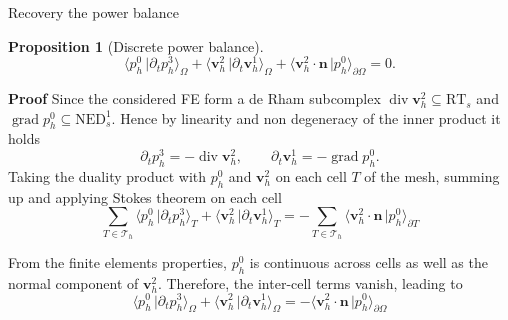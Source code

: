 \documentclass[aspectratio=169]{beamer}
\DeclareMathOperator*{\grad}{grad}
\renewcommand{\div}{\operatorname{div}}
\newcommand{\dualpr}[3][]{\ensuremath{\langle #2 \, \vert #3 \rangle_{#1}}}
\newtheorem{proposition}{Proposition}
\begin{document}
\begin{frame}{Recovery the power balance}
	
	\begin{proposition}[Discrete power balance]
	\begin{equation*}
		\dualpr[\Omega]{p^{0}_h}{\partial_t p^3_h} + \dualpr[\Omega]{\bm{v}^{2}_h}{\partial_t \bm{v}^{1}_h} + \dualpr[\partial \Omega]{\bm{v}^2_h \cdot \bm{n}}{p_{h}^{0}} = 0.
	\end{equation*}
	\end{proposition}
\textbf{Proof} Since the considered FE form a de Rham subcomplex $\div \bm{v}^2_h \subseteq \mathrm{RT}_s$ and $\grad p_h^0 \subseteq \mathrm{NED}_s^1$. Hence by linearity and non degeneracy of the inner product it holds
\begin{equation*}
	\partial_t p_h^3 = -\div \bm{v}^2_h, \qquad \partial_t \bm{v}_h^1 = -\grad p_h^0.
\end{equation*}
	Taking the duality product with $p_h^0$ and $\bm{v}_h^2$ on each cell $T$ of the mesh, summing up and applying Stokes theorem on each cell
\begin{equation*}
	\sum_{T \in \mathcal{T}_h} \dualpr[T]{p_h^0}{\partial_t p_h^3} + \dualpr[T]{\bm{v}^{2}_h}{\partial_t \bm{v}^{1}_h} = -\sum_{T \in \mathcal{T}_h} \dualpr[\partial T]{\bm{v}^2_h \cdot \bm{n}}{p_h^0}
\end{equation*}

From the finite elements properties, $p_h^0$ is continuous across cells as well as the normal component of $\bm{v}^{2}_h$. Therefore, the inter-cell terms vanish, leading to
\begin{equation*}
	\dualpr[\Omega]{p_h^0}{\partial_t p_h^3} + \dualpr[\Omega]{\bm{v}^{2}_h}{\partial_t \bm{v}^{1}_h}  = - \dualpr[\partial \Omega]{\bm{v}^2_h \cdot \bm{n}}{p_h^0}
\end{equation*}

\end{frame}
\end{document}
